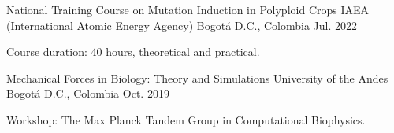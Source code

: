 \begin{cventries}
    
    \cventry
    {National Training Course on Mutation Induction in Polyploid Crops} %
    {IAEA (International Atomic Energy Agency)} %
    {Bogotá D.C., Colombia} %
    {Jul. 2022} %
    { %
    \begin{cvitems}
    \item {Course duration: 40 hours, theoretical and practical.}
    \end{cvitems}
    }
    
    
    \cventry
    {Mechanical Forces in Biology: Theory and Simulations} %
    {University of the Andes} %
    {Bogotá D.C., Colombia} %
    {Oct. 2019} %
    { %
    \begin{cvitems}
    \item {Workshop: The Max Planck Tandem Group in Computational Biophysics.}
    \end{cvitems}
    }
    
    
    \end{cventries}
    
